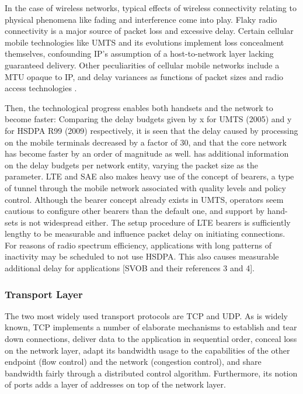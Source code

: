 In the case of wireless networks, typical effects of wireless connectivity relating to physical phenomena like fading and interference come into play. Flaky radio connectivity is a major source of packet loss and excessive delay. Certain cellular mobile technologies like \gls{UMTS} and its evolutions implement loss concealment themselves, confounding IP's assumption of a host-to-network layer lacking guaranteed delivery. Other peculiarities of cellular mobile networks include a \gls{MTU} opaque to IP, and delay variances as functions of packet sizes \cite{Arlos10} and radio access technologies \cite{laner2011dissecting}.


 Then, the technological progress enables both handsets and the network to become faster: Comparing the delay budgets given by x for \gls{UMTS} (2005) and y for \gls{HSDPA} R99 (2009) respectively, it is seen that the delay caused by processing on the mobile terminals decreased by a factor of 30, and that the core network has become faster by an order of magnitude as well. \cite{svoboda2006composition} has additional information on the delay budgets per network entity, varying the packet size as the parameter.
\gls{LTE} and \gls{SAE} also makes heavy use of the concept of bearers, a type of tunnel through the mobile network associated with quality levels and policy control. Although the bearer concept already exists in \gls{UMTS}, operators seem cautious to configure other bearers than the default one, and support by hand-sets is not widespread either. The setup procedure of \gls{LTE} bearers is sufficiently lengthy to be measurable and influence packet delay on initiating connections. 
%
For reasons of radio spectrum efficiency, applications with long patterns of inactivity may be scheduled to not use HSDPA. This also causes measurable additional delay for applications [SVOB and their references 3 and 4].
%


\subsubsection{Transport Layer}

The two most widely used transport protocols are \gls{TCP} and \gls{UDP}. As is widely known, \gls{TCP} implements a number of elaborate mechanisms to establish and tear down connections, deliver data to the application in sequential order, conceal loss on the network layer, adapt its bandwidth usage to the capabilities of the other endpoint (flow control) and the network (congestion control), and share bandwidth fairly through a distributed control algorithm. Furthermore, its notion of ports adds a layer of addresses on top of the network layer.

